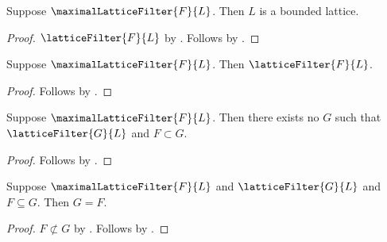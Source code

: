 \begin{proposition}\label{maximal_lattice_filter_ambient}
    Suppose $\maximalLatticeFilter{F}{L}$.
    Then $L$ is a bounded lattice.
\end{proposition}
\begin{proof}
    $\latticeFilter{F}{L}$ by .
    Follows by .
\end{proof}

\begin{proposition}\label{maximal_lattice_filter_is_filter}
    Suppose $\maximalLatticeFilter{F}{L}$.
    Then $\latticeFilter{F}{L}$.
\end{proposition}
\begin{proof}
    Follows by .
\end{proof}

\begin{proposition}\label{maximal_lattice_filter_no_strict_extension}
    Suppose $\maximalLatticeFilter{F}{L}$.
    Then there exists no $G$ such that
        $\latticeFilter{G}{L}$ and $F\subset G$.
\end{proposition}
\begin{proof}
    Follows by .
\end{proof}

\begin{theorem}\label{maximal_lattice_filter_extension_eq}
    Suppose $\maximalLatticeFilter{F}{L}$ and
        $\latticeFilter{G}{L}$ and $F\subseteq G$.
    Then $G=F$.
\end{theorem}
\begin{proof}
    $F\not\subset G$ by
        .
    Follows by .
\end{proof}

